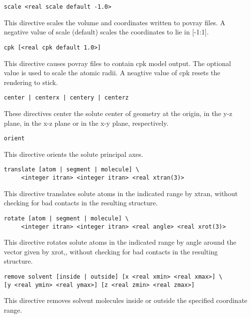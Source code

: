 \begin{verbatim}
scale <real scale default -1.0>
\end{verbatim}

This directive scales the volume and coordinates written to povray files.
A negative value of scale (default) scales the coordinates to lie
in [-1:1].

\begin{verbatim}
cpk [<real cpk default 1.0>]
\end{verbatim}

This directive causes povray files to contain cpk model output. The
optional value is used to scale the atomic radii. A neagtive value
of cpk resets the rendering to stick.

\begin{verbatim}
center | centerx | centery | centerz
\end{verbatim}

These directives center the solute center of geometry at the origin,
in the y-z plane, in the x-z plane or in the x-y plane, respectively.

\begin{verbatim}
orient
\end{verbatim}

This directive orients the solute principal axes.

\begin{verbatim}
translate [atom | segment | molecule] \
	 <integer itran> <integer itran> <real xtran(3)>
\end{verbatim}

This directive translates solute atoms in the indicated range by xtran,
without checking for bad contacts in the resulting structure.

\begin{verbatim}
rotate [atom | segment | molecule] \
	 <integer itran> <integer itran> <real angle> <real xrot(3)>
\end{verbatim}

This directive rotates solute atoms in the indicated range by angle
around the vector given by xrot,,
without checking for bad contacts in the resulting structure.

\begin{verbatim}
remove solvent [inside | outside] [x <real xmin> <real xmax>] \
[y <real ymin> <real ymax>] [z <real zmin> <real zmax>]
\end{verbatim}

This directive removes solvent molecules inside or outside the
specified coordinate range.

